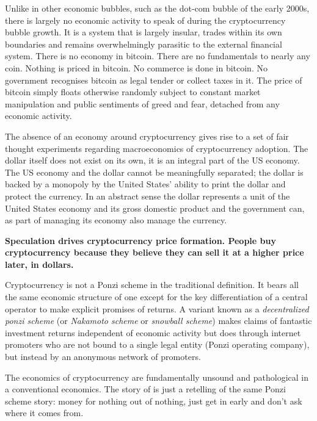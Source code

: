 Unlike in other economic bubbles, such as the dot-com bubble of the early 2000s,
there is largely no economic activity to speak of during the cryptocurrency
bubble growth. It is a system that is largely insular, trades within its own
boundaries and remains overwhelmingly parasitic to the external financial
system. There is no economy in bitcoin. There are no fundamentals to nearly any
coin. Nothing is priced in bitcoin. No commerce is done in bitcoin. No
government recognises bitcoin as legal tender or collect taxes in it.  The price
of bitcoin simply floats otherwise randomly subject to constant market
manipulation and public sentiments of greed and fear, detached from any economic
activity.

The absence of an economy around cryptocurrency gives rise to a set of fair
thought experiments regarding macroeconomics of cryptocurrency adoption. The
dollar itself does not exist on its own, it is an integral part of the US
economy. The US economy and the dollar cannot be meaningfully separated; the
dollar is backed by a monopoly by the United States' ability to print the dollar
and protect the currency. In an abstract sense the dollar represents a unit of
the United States economy and its gross domestic product and the government can,
as part of managing its economy also manage the currency.


\begin{infobox}
 \textbf{Speculation drives cryptocurrency price formation. People buy
  cryptocurrency because they believe they can sell it at a higher price later,
  in dollars.}
\end{infobox}

Cryptocurrency is not a Ponzi scheme in the traditional definition.  It bears
all the same economic structure of one except for the key differentiation of a
central operator to make explicit promises of returns. A variant known as a
\textit{decentralized ponzi scheme} (or \textit{Nakamoto scheme} or
\textit{snowball scheme}) makes claims of fantastic investment returns
independent of economic activity but does through internet promoters who are not
bound to a single legal entity (Ponzi operating company), but instead by an
anonymous network of promoters.


The economics of cryptocurrency are fundamentally unsound and pathological in a
conventional economics. The story of is just a retelling of the same Ponzi
scheme story: money for nothing out of nothing, just get in early and don't ask
where it comes from.
